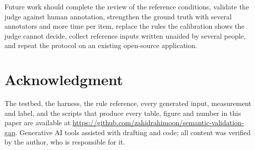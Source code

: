 \documentclass[conference]{IEEEtran}
\begin{document}
Future work should \ifreviewed\else complete the review of the reference conditions, \fi
\ifhumanlabels\else validate the judge against human annotation, \fi strengthen the ground truth with
several annotators and more time per item, replace the rules the calibration shows the judge cannot
decide, collect reference inputs written unaided by several people, and repeat the protocol on an
existing open-source application.

\section*{Acknowledgment}

The testbed, the harness, the rule reference, every generated input, measurement and label, and the
scripts that produce every table, figure and number in this paper are available at
\url{https://github.com/zahidrahimoon/semantic-validation-gap}. Generative AI tools assisted with
drafting and code; all content was verified by the author, who is responsible for it.



\end{document}
